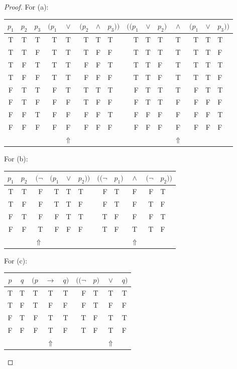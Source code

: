 \documentclass[12pt,a4paper]{article}
\theoremstyle{plain}
\begin{document}
\begin{proof}
For (a):
%
\begin{center}
\begin{tabular}{ccc||rcrcl|rclcrcl}
$p_1$ & $p_2$ & $p_3$ & $( p_1$ & $\vee$ & $( p_2$ & $\wedge$ & $p_3 ) )$ & $( ( p_1$ & $\vee$ & $p_2 )$ & $\wedge$ & $( p_1$ & $\vee$ & $p_3 ) )$ \\
\hline
T & T & T & T & T & T & T & T & T & T & T & T & T & T & T \\
T & T & F & T & T & T & F & F & T & T & T & T & T & T & F \\
T & F & T & T & T & F & F & T & T & T & F & T & T & T & T \\
T & F & F & T & T & F & F & F & T & T & F & T & T & T & F \\
F & T & T & F & T & T & T & T & F & T & T & T & F & T & T \\
F & T & F & F & F & T & F & F & F & T & T & F & F & F & F \\
F & F & T & F & F & F & F & T & F & F & F & F & F & F & T \\
F & F & F & F & F & F & F & F & F & F & F & F & F & F & F \\
  &   &   &  & $\Uparrow$ & & & &  &  &  & $\Uparrow$ & & &
\end{tabular}
\end{center}

For (b):
%
\begin{center}
\begin{tabular}{cc||rrcl|rlcrl}
$p_1$ & $p_2$ & $( \neg$ & $( p_1$ & $\vee$ & $p_2 ) )$ & $(( \neg$ & $p_1 )$ & $\wedge$ & $( \neg$ & $p_2 ) )$ \\
\hline
T & T & F & T & T & T & F& T & F & F & T \\
T & F & F & T & T & F & F& T & F & T & F \\
F & T & F & F & T & T & T& F & F & F & T \\
F & F & T & F & F & F & T& F & T & T & F \\
  &   & $\Uparrow$ &  &  &  &  &  & $\Uparrow$ &  &
\end{tabular}
\end{center}

For (c):
%
\begin{center}
\begin{tabular}{cc||rcl|rlcl}
$p$ & $q$ & $( p$ & $\rightarrow$ & $q )$ & $(( \neg$ & $p )$ & $\vee$ & $q )$ \\
\hline
T & T & T & T & T & F & T & T & T \\
T & F & T & F & F & F & T & F & F \\
F & T & F & T & T & T & F & T & T \\
F & F & F & T & F & T & F & T & F \\
  &   &  & $\Uparrow$ & &  &  & $\Uparrow$ & 
\end{tabular}
\end{center}


\end{proof}
\end{document}
